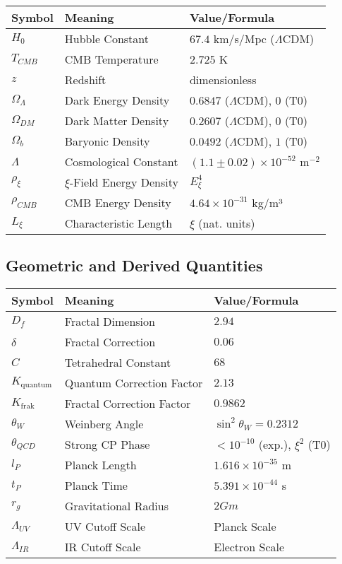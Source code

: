 \documentclass[12pt,a4paper]{article}
\begin{document}
	\begin{longtable}{lll}
		\toprule
		\textbf{Symbol} & \textbf{Meaning} & \textbf{Value/Formula} \\
		\midrule
		$H_0$ & Hubble Constant & $67.4$ km/s/Mpc ($\Lambda$CDM) \\
		$T_{CMB}$ & CMB Temperature & $2.725$ K \\
		$z$ & Redshift & dimensionless \\
		$\Omega_\Lambda$ & Dark Energy Density & $0.6847$ ($\Lambda$CDM), $0$ (T0) \\
		$\Omega_{DM}$ & Dark Matter Density & $0.2607$ ($\Lambda$CDM), $0$ (T0) \\
		$\Omega_b$ & Baryonic Density & $0.0492$ ($\Lambda$CDM), $1$ (T0) \\
		$\Lambda$ & Cosmological Constant & $(1.1 \pm 0.02) \times 10^{-52}$ m$^{-2}$ \\
		$\rho_\xi$ & $\xi$-Field Energy Density & $E_\xi^4$ \\
		$\rho_{CMB}$ & CMB Energy Density & $4.64 \times 10^{-31}$ kg/m³ \\
		$L_\xi$ & Characteristic Length & $\xi$ (nat. units) \\
		\bottomrule
	\end{longtable}
	
	\subsection{Geometric and Derived Quantities}
	
	\begin{longtable}{lll}
		\toprule
		\textbf{Symbol} & \textbf{Meaning} & \textbf{Value/Formula} \\
		\midrule
		$D_f$ & Fractal Dimension & $2.94$ \\
		$\delta$ & Fractal Correction & $0.06$ \\
		$C$ & Tetrahedral Constant & $68$ \\
		$K_{\text{quantum}}$ & Quantum Correction Factor & $2.13$ \\
		$K_{\text{frak}}$ & Fractal Correction Factor & $0.9862$ \\
		$\theta_W$ & Weinberg Angle & $\sin^2\theta_W = 0.2312$ \\
		$\theta_{QCD}$ & Strong CP Phase & $< 10^{-10}$ (exp.), $\xi^2$ (T0) \\
		$l_P$ & Planck Length & $1.616 \times 10^{-35}$ m \\
		$t_P$ & Planck Time & $5.391 \times 10^{-44}$ s \\
		$r_g$ & Gravitational Radius & $2Gm$ \\
		$\Lambda_{UV}$ & UV Cutoff Scale & Planck Scale \\
		$\Lambda_{IR}$ & IR Cutoff Scale & Electron Scale \\
		\bottomrule
	\end{longtable}
	
\end{document}
